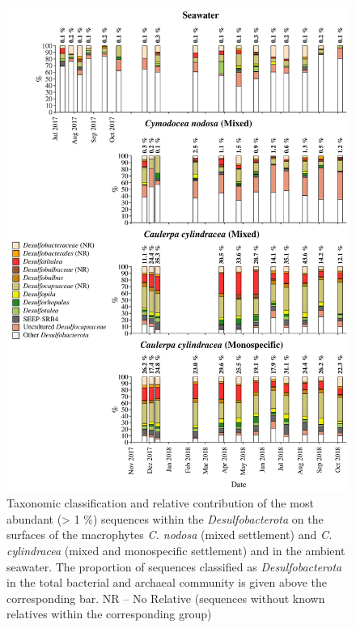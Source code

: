 \documentclass[12pt,]{article}
\begin{document}
\begin{figure}[H]

{\centering \includegraphics[width=0.85\linewidth]{../results/figures/desulfobacterota_bar_plot} 

}

\caption{Taxonomic classification and relative contribution of the most abundant (> 1 \si{\percent}) sequences within the \textit{Desulfobacterota} on the surfaces of the macrophytes \textit{C. nodosa} (mixed settlement) and \textit{C. cylindracea} (mixed and monospecific settlement) and in the ambient seawater. The proportion of sequences classified as \textit{Desulfobacterota} in the total bacterial and archaeal community is given above the corresponding bar. NR -- No Relative (sequences without known relatives within the corresponding group)\label{desulfo}}\label{fig:unnamed-chunk-9}
\end{figure}
\end{document}

